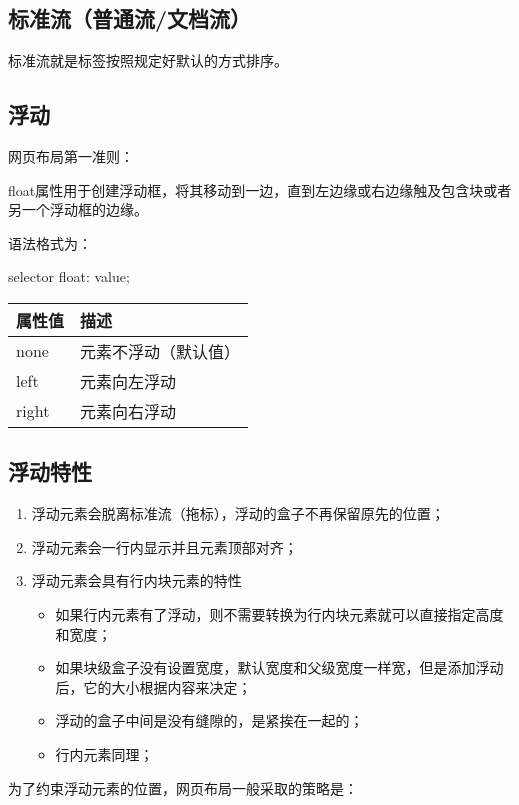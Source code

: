 \subsection{标准流（普通流/文档流）}
标准流就是标签按照规定好默认的方式排序。
\subsection{浮动}
网页布局第一准则：

float属性用于创建浮动框，将其移动到一边，直到左边缘或右边缘触及包含块或者另一个浮动框的边缘。

语法格式为：
\begin{css}
	selector {
	float: value;
	}
\end{css}
\begin{table}[H]
	\centering
	\begin{tabular}{ll}
		\hline
		属性值   & 描述         \\
		\hline
		none  & 元素不浮动（默认值） \\
		left  & 元素向左浮动     \\
		right & 元素向右浮动     \\
		\hline
	\end{tabular}
\end{table}
\subsection{浮动特性}
\begin{enumerate}
	\item 浮动元素会脱离标准流（拖标），浮动的盒子不再保留原先的位置；
	\item 浮动元素会一行内显示并且元素顶部对齐；
	\item 浮动元素会具有行内块元素的特性
	      \begin{itemize}
		      \item 如果行内元素有了浮动，则不需要转换为行内块元素就可以直接指定高度和宽度；
		      \item 如果块级盒子没有设置宽度，默认宽度和父级宽度一样宽，但是添加浮动后，它的大小根据内容来决定；
		      \item 浮动的盒子中间是没有缝隙的，是紧挨在一起的；
		      \item 行内元素同理；
	      \end{itemize}
\end{enumerate}

为了约束浮动元素的位置，网页布局一般采取的策略是：

